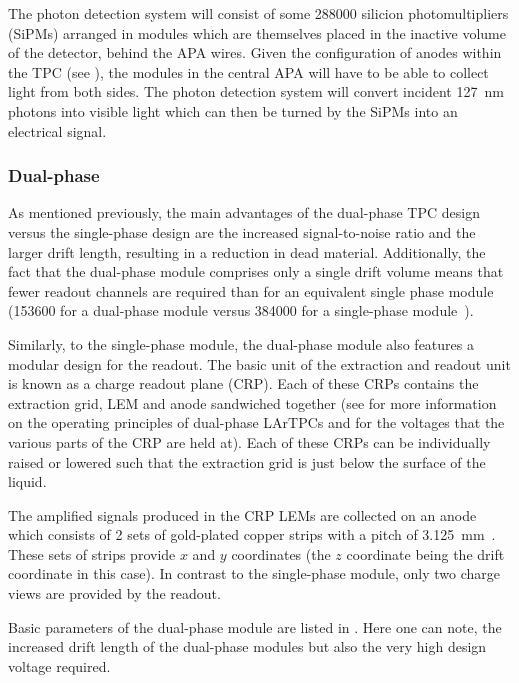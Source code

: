 The photon detection system will consist of some \num{288000} silicion photomultipliers (SiPMs) arranged in modules which are themselves placed in the inactive volume of the detector, behind the APA wires.
Given the configuration of anodes within the TPC (see ), the modules in the central APA will have to be able to collect light from both sides.
The photon detection system will convert incident \SI{127}{\nano\metre} photons into visible light which can then be turned by the SiPMs into an electrical signal.

\subsubsection{Dual-phase}
\label{sec:dune:fd:modules:dualphase}
As mentioned previously, the main advantages of the dual-phase TPC design versus the single-phase design are the increased signal-to-noise ratio and the larger drift length, resulting in a reduction in dead material.
Additionally, the fact that the dual-phase module comprises only a single drift volume means that fewer readout channels are required than for an equivalent single phase module (\num{153600} for a dual-phase module versus \num{384000} for a single-phase module~\cite{idrVol3}).

Similarly, to the single-phase module, the dual-phase module also features a modular design for the readout.
The basic unit of the extraction and readout unit is known as a charge readout plane (CRP).
Each of these CRPs contains the extraction grid, LEM and anode sandwiched together (see  for more information on the operating principles of dual-phase LArTPCs and  for the voltages that the various parts of the CRP are held at).
Each of these CRPs can be individually raised or lowered such that the extraction grid is just below the surface of the liquid.

The amplified signals produced in the CRP LEMs are collected on an anode which consists of 2 sets of gold-plated copper strips with a pitch of \SI{3.125}{\milli\metre}~\cite{idrVol3}.
These sets of strips provide $x$ and $y$ coordinates (the $z$ coordinate being the drift coordinate in this case).
In contrast to the single-phase module, only two charge views are provided by the readout. 

Basic parameters of the dual-phase module are listed in .
Here one can note, the increased drift length of the dual-phase modules but also the very high design voltage required.

